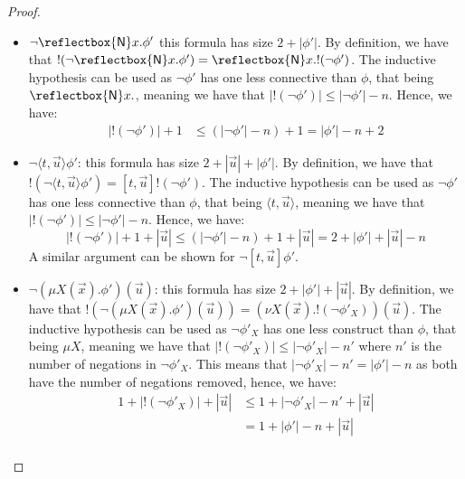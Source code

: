 \documentclass[10pt,a4paper]{article}
\theoremstyle{definition}
\theoremstyle{remark}
\newcommand\new[0]{\reflectbox{\ensuremath{\mathsf{N}}}}
\newcommand\fresh[1]{\new #1.}
\newcommand\diam[1]{\langle#1\rangle}
\newcommand\sq[1]{[#1]}
\begin{document}
\begin{proof}
\begin{itemize}
		By definition, we have that $!(\lnot \bigvee\nolimits_x \phi') = \bigwedge\nolimits_x !(\lnot \phi')$. 
		The inductive hypothesis can be used as $\lnot \phi'$ has one less connective than $\phi$, that being $\bigvee\nolimits_x$, meaning
		we have that $|!(\lnot \phi')| \le |\lnot \phi'| - n$.
		Hence, we have:
		\begin{align*}
			|!(\lnot \phi')| + 1 &\le (|\lnot \phi'| - n) + 1= |\phi'| - n + 2
		\end{align*}    
		A similar argument can be shown for $\lnot\bigwedge\nolimits_x \phi'$.
		        \item $\lnot \fresh{x}\phi'$ this formula has size $2 + |\phi'|$. 
		By definition, we have that $!(\lnot \fresh{x} \phi') = \fresh{x}!(\lnot \phi')$. 
		The inductive hypothesis can be used as $\lnot \phi'$ has one less connective than $\phi$, that being $\fresh{x}$, meaning
		we have that $|!(\lnot \phi')| \le |\lnot \phi'| - n$.
		Hence, we have:
		\begin{align*}
			|!(\lnot \phi')| + 1 &\le (|\lnot \phi'| - n) + 1= |\phi'| - n + 2
		\end{align*}
				\item $\lnot \diam{t, \vec u} \phi'$: 
		this formula has size $2 + |\vec u| + |\phi'|$. 
		By definition, we have that $!(\lnot\diam{t, \vec u}\phi') = \sq{t, \vec u}!(\lnot \phi')$.
		The inductive hypothesis can be used as $\lnot \phi'$ has one less connective than $\phi$, that being $\diam{t, \vec u}$, meaning we have that $|!(\lnot \phi')| \le |\lnot \phi'| - n$. 
		Hence, we have:
		\[
		|!(\lnot \phi')| + 1 + |\vec u| \le (|\lnot \phi'| - n) + 1 + |\vec u| = 2 + |\phi'| + |\vec u| - n 
		\]
		A similar argument can be shown for $\lnot\sq{t, \vec u}\phi'$.
				\item $\lnot (\mu X(\vec x).\phi')(\vec u)$: this formula has size $2 + |\phi'| + |\vec u|$. 
		By definition, we have that $!(\lnot (\mu X(\vec x).\phi')(\vec u)) = (\nu X(\vec x).!(\lnot \phi'_X))(\vec u)$.
		The inductive hypothesis can be used as $\lnot \phi'_X$ has one less construct than $\phi$, that being $\mu X$, meaning
		we have that $|!(\lnot\phi'_X)| \leq |\lnot \phi'_X| - n'$ where $n'$ is the number of negations in $\lnot \phi'_X$.
		This means that $|\lnot \phi'_X| - n' = |\phi'| - n$ as both have the number of negations removed,
		hence, we have:
		\begin{align*}
			1 + |!(\lnot \phi'_X)| + |\vec u| &\le 1 + |\lnot \phi'_X| - n' + |\vec u| \\
			&= 1 + |\phi'| - n + |\vec u|\\

\end{align*}
\end{itemize}
\end{proof}
\end{document}
